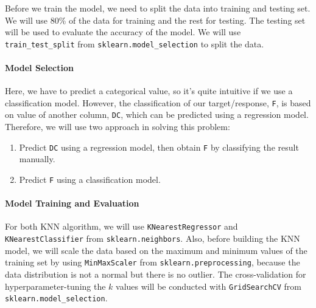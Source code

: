 \documentclass[conf]{new-aiaa}
\begin{document}
Before we train the model, we need to split the data into training and testing set. We will use 80\% of the data for training and the rest for testing. The testing set will be used to evaluate the accuracy of the model. We will use \texttt{train\_test\_split} from \texttt{sklearn.model\_selection} to split the data. 

\paragraph{Model Selection}
Here, we have to predict a categorical value, so it's quite intuitive if we use a classification model. However, the classification of our target/response, \texttt{F}, is based on value of another column, \texttt{DC}, which can be predicted using a regression model. Therefore, we will use two approach in solving this problem:
\begin{enumerate}
    \item Predict \texttt{DC} using a regression model, then obtain \texttt{F} by classifying the result manually.
    \item Predict \texttt{F} using a classification model.
\end{enumerate}

\paragraph{Model Training and Evaluation}
For both KNN algorithm, we will use \texttt{KNearestRegressor} and \texttt{KNearestClassifier} from \texttt{sklearn.neighbors}. Also, before building the KNN model, we will scale the data based on the maximum and minimum values of the training set by using \texttt{MinMaxScaler} from \texttt{sklearn.preprocessing}, because the data distribution is not a normal but there is no outlier. The cross-validation for hyperparameter-tuning the $k$ values will be conducted with \texttt{GridSearchCV} from \texttt{sklearn.model\_selection}. 
\end{document}

